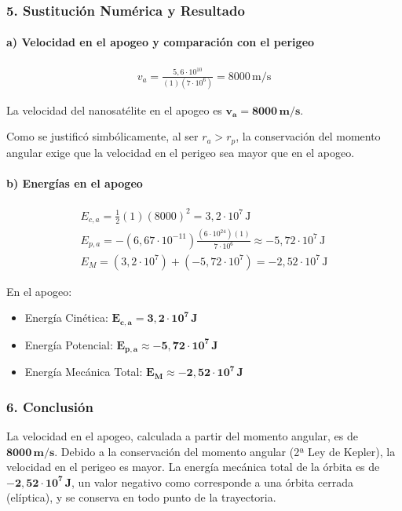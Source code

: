 \subsubsection*{5. Sustitución Numérica y Resultado}
\paragraph*{a) Velocidad en el apogeo y comparación con el perigeo}
\begin{gather}
    v_a = \frac{5,6 \cdot 10^{10}}{(1)(7 \cdot 10^6)} = 8000 \, \text{m/s}
\end{gather}
\begin{cajaresultado}
    La velocidad del nanosatélite en el apogeo es $\boldsymbol{v_a = 8000 \, m/s}$.
\end{cajaresultado}
\medskip
Como se justificó simbólicamente, al ser $r_a > r_p$, la conservación del momento angular exige que la velocidad en el perigeo sea mayor que en el apogeo.

\paragraph*{b) Energías en el apogeo}
\begin{gather}
    E_{c,a} = \frac{1}{2} (1) (8000)^2 = 3,2 \cdot 10^7 \, \text{J} \\
    E_{p,a} = -(6,67 \cdot 10^{-11}) \frac{(6 \cdot 10^{24})(1)}{7 \cdot 10^6} \approx -5,72 \cdot 10^7 \, \text{J} \\
    E_M = (3,2 \cdot 10^7) + (-5,72 \cdot 10^7) = -2,52 \cdot 10^7 \, \text{J}
\end{gather}
\begin{cajaresultado}
    En el apogeo:
    \begin{itemize}
        \item Energía Cinética: $\boldsymbol{E_{c,a} = 3,2 \cdot 10^7 \, J}$
        \item Energía Potencial: $\boldsymbol{E_{p,a} \approx -5,72 \cdot 10^7 \, J}$
        \item Energía Mecánica Total: $\boldsymbol{E_M \approx -2,52 \cdot 10^7 \, J}$
    \end{itemize}
\end{cajaresultado}

\subsubsection*{6. Conclusión}
\begin{cajaconclusion}
    La velocidad en el apogeo, calculada a partir del momento angular, es de $\mathbf{8000 \, m/s}$. Debido a la conservación del momento angular (2ª Ley de Kepler), la velocidad en el perigeo es mayor. La energía mecánica total de la órbita es de $\mathbf{-2,52 \cdot 10^7 \, J}$, un valor negativo como corresponde a una órbita cerrada (elíptica), y se conserva en todo punto de la trayectoria.
\end{cajaconclusion}


